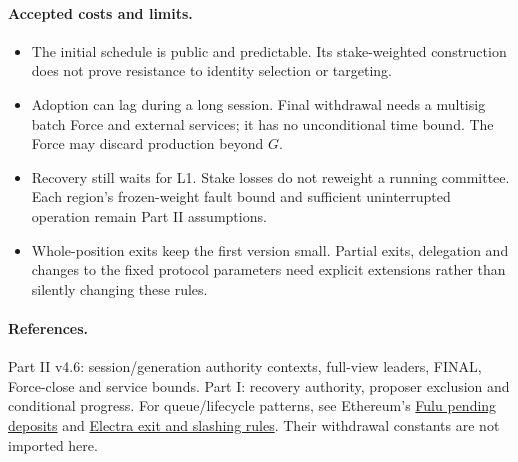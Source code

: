 \documentclass[11pt,a4paper]{article}
\begin{document}
\paragraph{Accepted costs and limits.}
\begin{itemize}[itemsep=3pt]
\item The initial schedule is public and predictable. Its stake-weighted
construction does not prove resistance to identity selection or targeting.
\item Adoption can lag during a long session. Final withdrawal needs a
multisig batch Force and external services; it has no unconditional time
bound. The Force may discard production beyond $G$.
\item Recovery still waits for L1. Stake losses do not reweight a running
committee. Each region's frozen-weight fault bound and sufficient
uninterrupted operation remain Part II assumptions.
\item Whole-position exits keep the first version small. Partial exits,
delegation and changes to the fixed protocol parameters need explicit
extensions rather than silently changing these rules.
\end{itemize}

\paragraph{References.}
Part II v4.6: session/generation authority contexts, full-view leaders,
FINAL, Force-close and service bounds.
Part I: recovery authority, proposer exclusion and conditional progress.
For queue/lifecycle patterns, see Ethereum's
\href{https://ethereum.github.io/consensus-specs/specs/fulu/beacon-chain/}{Fulu pending deposits}
and \href{https://ethereum.github.io/consensus-specs/specs/electra/beacon-chain/}{Electra exit and slashing rules}.
Their withdrawal constants are not imported here.
\end{document}
